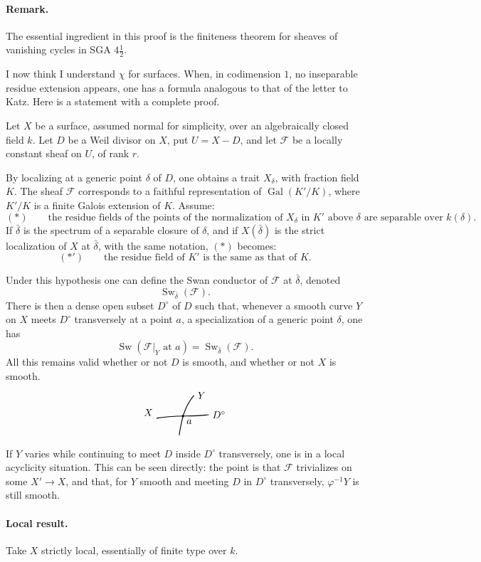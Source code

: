 \documentclass[11pt]{article}
\newcommand{\transverseCurveSketch}{%
\begin{tikzpicture}[scale=.8,baseline=-.5ex]
  \draw[thick] (-.15,0) .. controls (.7,.15) and (1.35,.05) .. (2.15,.15) node[right]{$D^\circ$};
  \draw[thick] (.85,-.75) .. controls (.95,-.1) and (1.05,.45) .. (1.5,1.0) node[right]{$Y$};
  \fill (1.02,.09) circle (1.4pt) node[below right]{$a$};
  \node[left] at (-.15,.25){$X$};
\end{tikzpicture}%
}
\newcommand{\F}{\mathcal F}
\DeclareMathOperator{\Sw}{Sw}
\begin{document}
\paragraph{Remark.}
The essential ingredient in this proof is the finiteness theorem for sheaves of vanishing cycles in SGA \(4\frac12\).

I now think I understand \(\chi\) for surfaces. When, in codimension \(1\), no inseparable residue extension appears, one has a formula analogous to that of the letter to Katz. Here is a statement with a complete proof.

Let \(X\) be a surface, assumed normal for simplicity, over an algebraically closed field \(k\). Let \(D\) be a Weil divisor on \(X\), put \(U=X-D\), and let \(\F\) be a locally constant sheaf on \(U\), of rank \(r\).

By localizing at a generic point \(\delta\) of \(D\), one obtains a trait \(X_\delta\), with fraction field \(K\). The sheaf \(\F\) corresponds to a faithful representation of \(\operatorname{Gal}(K'/K)\), where \(K'/K\) is a finite Galois extension of \(K\). Assume:
\[
(*)\qquad
\text{the residue fields of the points of the normalization of }X_\delta
\text{ in }K'\text{ above }\delta\text{ are separable over }k(\delta).
\]
If \(\bar\delta\) is the spectrum of a separable closure of \(\delta\), and if \(X(\bar\delta)\) is the strict localization of \(X\) at \(\bar\delta\), with the same notation, \((*)\) becomes:
\[
(*')\qquad \text{the residue field of }K'\text{ is the same as that of }K.
\]

Under this hypothesis one can define the Swan conductor of \(\F\) at \(\bar\delta\), denoted
\[
  \Sw_{\bar\delta}(\F).
\]
There is then a dense open subset \(D^\circ\) of \(D\) such that, whenever a smooth curve \(Y\) on \(X\) meets \(D^\circ\) transversely at a point \(a\), a specialization of a generic point \(\delta\), one has
\[
  \Sw(\F|_Y\text{ at }a)=\Sw_{\bar\delta}(\F).
\]
All this remains valid whether or not \(D\) is smooth, and whether or not \(X\) is smooth.
\[
\transverseCurveSketch
\]

If \(Y\) varies while continuing to meet \(D\) inside \(D^\circ\) transversely, one is in a local acyclicity situation. This can be seen directly: the point is that \(\F\) trivializes on some \(X'\to X\), and that, for \(Y\) smooth and meeting \(D\) in \(D^\circ\) transversely, \(\varphi^{-1}Y\) is still smooth.

\paragraph{Local result.}
Take \(X\) strictly local, essentially of finite type over \(k\).
\end{document}
